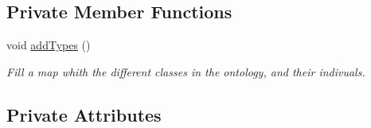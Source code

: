 \subsection*{Private Member Functions}
\begin{DoxyCompactItemize}
\item 
void \hyperlink{class_data_base_1_1_individuals_ac64452335dc7967bc2d536a690c669f6}{addTypes} ()
\begin{DoxyCompactList}\small\item\em Fill a map whith the different classes in the ontology, and their indivuals. \end{DoxyCompactList}\end{DoxyCompactItemize}
\subsection*{Private Attributes}
